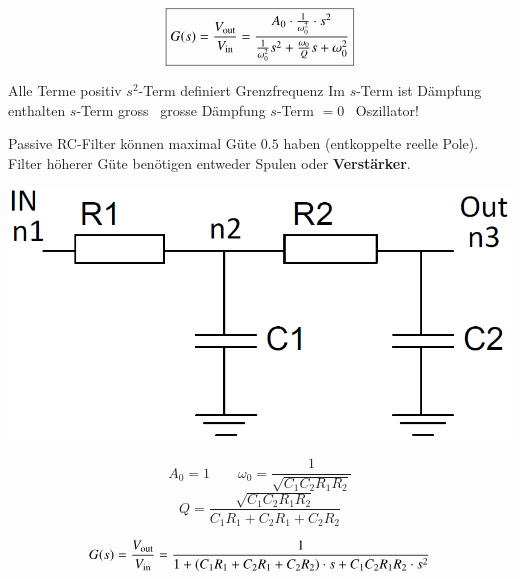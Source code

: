 \vspace{0.2cm}

\begin{minipage}[t]{0.48\columnwidth}
    \begin{center}
    \end{center}
    $$ \boxed{ G(s) = \frac{V_{\rm out}}{V_{\rm in}} = \frac{A_0 \cdot \frac{1}{\omega_0^2} \cdot s^2}{\frac{1}{\omega_0^2} s^2 + \frac{\omega_0}{Q} s + \omega_0^2 } } $$
\end{minipage}
\hfill
\begin{minipage}[t]{0.48\columnwidth}
    \begin{center}
    \end{center}
    \begin{outline}
        \1 Alle Terme positiv
        \1 $s^2$-Term definiert Grenzfrequenz
        \1 Im $s$-Term ist Dämpfung enthalten
            \2 $s$-Term gross \textrightarrow\ grosse Dämpfung
            \2 $s$-Term $= 0$ \textrightarrow\ Oszillator!
    \end{outline}
\end{minipage}

\vspace{0.2cm}

Passive RC-Filter können maximal Güte $0.5$ haben (entkoppelte reelle Pole). Filter höherer Güte benötigen entweder
Spulen oder \textbf{Verstärker}.




\begin{minipage}[c]{0.4\columnwidth}
    \includegraphics[width=\columnwidth]{images/tiefpass_ordnung_2.png}
\end{minipage}
\hfill
\begin{minipage}[c]{0.58\columnwidth}
    $$ A_0 = 1 \qquad \omega_0 = \frac{1}{\sqrt{C_1 C_2 R_1 R_2}} $$
    $$ Q = \frac{\sqrt{C_1 C_2 R_1 R_2}}{C_1 R_1 + C_2 R_1 + C_2 R_2} $$
\end{minipage}
$$ G(s) = \frac{V_{\rm out}}{V_{\rm in}} = \frac{1}{1 + (C_1 R_1 + C_2 R_1 + C_2 R_2) \cdot s + C_1 C_2 R_1 R_2 \cdot s^2 } $$


